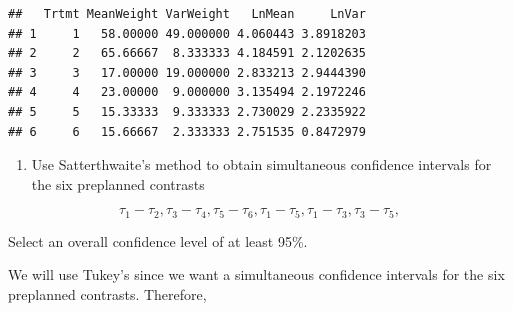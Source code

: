 \documentclass[12pt,]{article}
\newenvironment{Shaded}{\begin{snugshade}}{\end{snugshade}}
\newcommand{\KeywordTok}[1]{\textcolor[rgb]{0.13,0.29,0.53}{\textbf{#1}}}
\newcommand{\DecValTok}[1]{\textcolor[rgb]{0.00,0.00,0.81}{#1}}
\newcommand{\StringTok}[1]{\textcolor[rgb]{0.31,0.60,0.02}{#1}}
\newcommand{\CommentTok}[1]{\textcolor[rgb]{0.56,0.35,0.01}{\textit{#1}}}
\newcommand{\OperatorTok}[1]{\textcolor[rgb]{0.81,0.36,0.00}{\textbf{#1}}}
\newcommand{\NormalTok}[1]{#1}
\providecommand{\tightlist}{%
  \setlength{\itemsep}{0pt}\setlength{\parskip}{0pt}}
\begin{document}
\begin{Shaded}
\end{Shaded}

\begin{verbatim}
##   Trtmt MeanWeight VarWeight   LnMean     LnVar
## 1     1   58.00000 49.000000 4.060443 3.8918203
## 2     2   65.66667  8.333333 4.184591 2.1202635
## 3     3   17.00000 19.000000 2.833213 2.9444390
## 4     4   23.00000  9.000000 3.135494 2.1972246
## 5     5   15.33333  9.333333 2.730029 2.2335922
## 6     6   15.66667  2.333333 2.751535 0.8472979
\end{verbatim}

\begin{enumerate}
\def\labelenumi{(\alph{enumi})}
\setcounter{enumi}{1}
\tightlist
\item
  Use Satterthwaite's method to obtain simultaneous confidence intervals
  for the six preplanned contrasts
\end{enumerate}

\[\tau_1 -\tau_2, \tau_3 -\tau_4, \tau_5 -\tau_6, \tau_1 -\tau_5, \tau_1 -\tau_3, \tau_3 -\tau_5,\]

Select an overall confidence level of at least 95\%.

We will use Tukey's since we want a simultaneous confidence intervals
for the six preplanned contrasts. Therefore,
\end{document}
